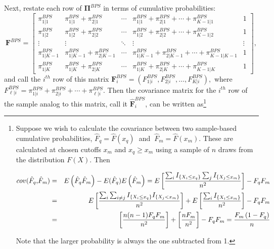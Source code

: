\documentclass[12pt]{article} \usepackage{amsmath,amssymb,amsthm,geometry,graphicx,setspace,algorithm,algpseudocode,float}
\begin{document}
Next, restate each row of $\mathbf{\Pi }^{BPS}$ in terms of cumulative
probabilities: 
\begin{equation*}
\mathbf{F}^{BPS}=\left[ 
\begin{array}{ccccc}
\pi _{1|1}^{BPS} & \pi _{1|1}^{BPS}+\pi _{2|1}^{BPS} & \cdots  & \pi
_{1|1}^{BPS}+\pi _{2|1}^{BPS}+\cdots +\pi _{K-1|1}^{BPS} & 1 \\ 
\pi _{1|2}^{BPS} & \pi _{1|2}^{BPS}+\pi _{2|2}^{BPS} & \cdots  & \pi
_{1|2}^{BPS}+\pi _{2|2}^{BPS}+\cdots +\pi _{K-1|2}^{BPS} & 1 \\ 
\vdots  & \vdots  & \ddots  & \vdots  & \vdots  \\ 
\pi _{1|K-1}^{BPS} & \pi _{1|K-1}^{BPS}+\pi _{2|K-1}^{BPS} & \cdots  & \pi
_{1|K-1}^{BPS}+\pi _{2|K-1}^{BPS}+\cdots +\pi _{K-1|K-1}^{BPS} & 1 \\ 
\pi _{1|K}^{BPS} & \pi _{1|K}^{BPS}+\pi _{2|K}^{BPS} & \cdots  & \pi
_{1|K}^{BPS}+\pi _{2|K}^{BPS}+\cdots +\pi _{K-1|K}^{BPS} & 1%
\end{array}%
\right] ,
\end{equation*}%
and call the $i^{th}$ row of this matrix $\mathbf{F}_{i}^{BPS}=\left(
F_{1|i}^{BPS},F_{2|i}^{BPS},\ldots ,F_{K|i}^{BPS}\right) ,$ where $F_{\ell
|i}^{BPS}=\pi _{1|i}^{BPS}+\pi _{2|i}^{BPS}+\cdots +\pi _{\ell |i}^{BPS}.$
Then the covariance matrix for the $i^{th}$ row of the sample analog to this
matrix, call it $\mathbf{\hat{F}}_{i}^{BPS}$, can be written as\footnote{%
Suppose we wish to calculate the covariance between two sample-based
cumulative probabilities, $\hat{F}_{q}=\hat{F}(x_{q})$\textbf{\ }and\textbf{\ 
}$\hat{F}_{m}=\hat{F}(x_{m}).$ These are calculated at chosen cutoffs $x_{m}$
and $x_{q}\geq x_{m}$ using a sample of $n$ draws from the distribution $F(X)
$. Then %
\par
\begin{center}
\begin{eqnarray*}
cov(\hat{F}_{q}\mathbf{,}\hat{F}_{m}) &=&E\left( \hat{F}_{q}\hat{F}%
_{m}\right) -E(\hat{F}_{q}\mathbf{)}E\left( \hat{F}_{m}\right) =E\left[ 
\frac{\sum_{i}I_{\{X_{i}\leq x_{q}\}}\sum_{j}I_{\{X_j\leq x_{m}\}}}{n^{2}}%
\right] -F_{q}F_{m} \\
&=&E\left[ \frac{\sum_{i}\sum_{i\neq j}I_{\{X_{i}\leq
x_{q}\}}I_{\{X_{j}<x_{m}\}}}{n^{2}}\right] +E\left[ \frac{%
\sum_{i}I_{\{X_{i}\leq x_{m}\}}}{n^{2}}\right] -F_{q}F_{m} \\
&=&\left[ \frac{n(n-1)F_{q}F_{m}}{n^{2}}\right] +\left[ \frac{nF_{m}}{n^{2}}%
\right] -F_{q}F_{m}=\frac{F_{m}\left( 1-F_{q}\right) }{n}
\end{eqnarray*}%
\end{center}
\par
Note that the larger probability is always the one subtracted from 1.}
\end{document}
